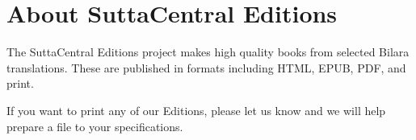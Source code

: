 \documentclass[12pt,openany]{book}%
\begin{document}
\section*{About SuttaCentral Editions}

The SuttaCentral Editions project makes high quality books from selected Bilara translations. These are published in formats including HTML, EPUB, PDF, and print.

If you want to print any of our Editions, please let us know and we will help prepare a file to your specifications.

%
\end{document}
